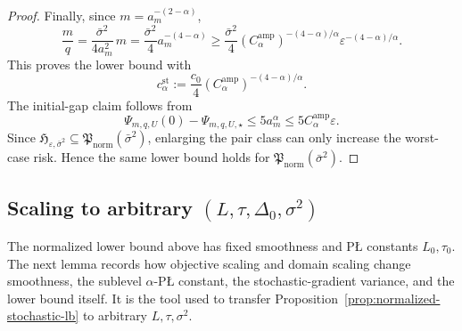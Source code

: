 \documentclass[11pt]{article}
\begin{document}
\begin{proof}
Finally, since $m=a_m^{-(2-\alpha)}$,
\[
\frac{m}{q}
=
\frac{\bar \sigma^2}{4a_m^2}\,m
=
\frac{\bar \sigma^2}{4}a_m^{-(4-\alpha)}
\ge
\frac{\bar \sigma^2}{4}(C_\alpha^{\mathrm{amp}})^{-(4-\alpha)/\alpha}
\varepsilon^{-(4-\alpha)/\alpha}.
\]
This proves the lower bound with
\[
c_\alpha^{\mathrm{st}}:=\frac{c_0}{4}(C_\alpha^{\mathrm{amp}})^{-(4-\alpha)/\alpha}.
\]
The initial-gap claim follows from
\[
\Psi_{m,q,U}(0)-\Psi_{m,q,U,\star}\le 5a_m^\alpha\le 5C_\alpha^{\mathrm{amp}} \varepsilon.
\]
Since \(\mathfrak H_{\varepsilon,\bar \sigma^2}\subseteq \mathfrak P_{\mathrm{norm}}(\bar\sigma^2)\), enlarging the
pair class can only increase the worst-case risk. Hence the same lower bound holds for
\(\mathfrak P_{\mathrm{norm}}(\bar\sigma^2)\).
\end{proof}

\subsection{\texorpdfstring{Scaling to arbitrary $(L,\tau,\Delta_0,\sigma^2)$}{Scaling to arbitrary (L,tau,Delta0,sigma2)}}
\label{app:sto-scaling}

The normalized lower bound above has fixed smoothness and P\L{} constants \(L_0,\tau_0\). The next lemma records how
objective scaling and domain scaling change smoothness, the sublevel \(\alpha\)-P\L{} constant, the stochastic-gradient
variance, and the lower bound itself. It is the tool used to transfer Proposition~\ref{prop:normalized-stochastic-lb}
to arbitrary \(L,\tau,\sigma^2\).
\end{document}
